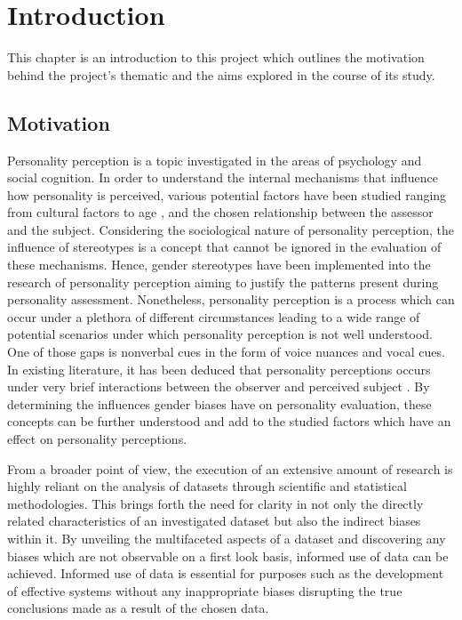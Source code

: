 \documentclass{l4proj}
\begin{document}
\chapter{Introduction}



This chapter is an introduction to this project which outlines the motivation behind the project’s thematic and the aims explored in the course of its study. 

\section{Motivation}
Personality perception is a topic investigated in the areas of psychology and social cognition. In order to understand the internal mechanisms that influence how personality is perceived, various potential factors have been studied ranging from cultural factors \citep{mccrae2005universal} to age \citep{Chapman2007}, and the chosen relationship between the assessor and the subject. Considering the sociological nature of personality perception, the influence of stereotypes is a concept that cannot be ignored in the evaluation of these mechanisms.
Hence, gender stereotypes have been implemented into the research of personality perception aiming to justify the patterns present during personality assessment. 
Nonetheless, personality perception is a process which can occur under a plethora of different circumstances leading to a wide range of potential scenarios under which personality perception is not well understood. One of those gaps is nonverbal cues in the form of voice nuances and vocal cues. In existing literature, it has been deduced that personality perceptions occurs under very brief interactions between the observer and perceived subject \citep{todorov2009evaluating, McAleer2014}. By determining the influences gender biases have on personality evaluation, these concepts can be further understood and add to the studied factors which have an effect on personality perceptions.

From a broader point of view, the execution of an extensive amount of research is highly reliant on the analysis of datasets through scientific and statistical methodologies. This brings forth the need for clarity in not only the directly related characteristics of an investigated dataset but also the indirect biases within it. By unveiling the multifaceted aspects of a dataset and discovering any biases which are not observable on a first look basis, informed use of data can be achieved. Informed use of data is essential for purposes such as the development of effective systems without any inappropriate biases disrupting the true conclusions made as a result of the chosen data.
\end{document}
